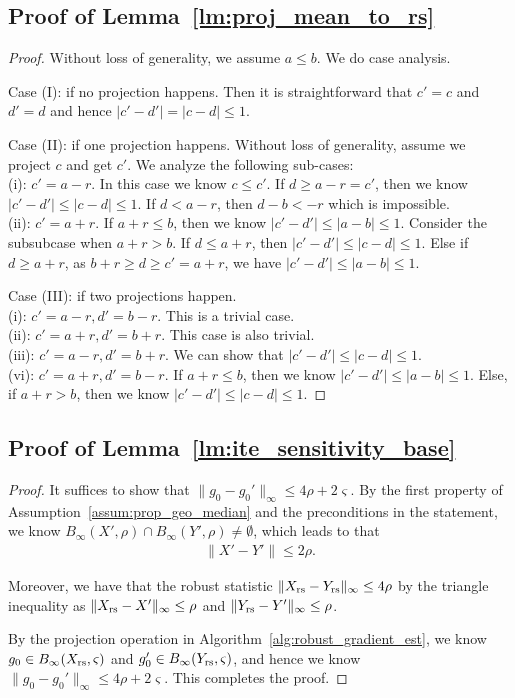 \subsection{Proof of Lemma~\ref{lm:proj_mean_to_rs}}
\projmeantors*
\begin{proof}
    Without loss of generality, we assume $a\le b$.
    We do case analysis.

    Case (I): if no projection happens. Then it is straightforward that $c'=c$ and $d'=d$ and hence $|c'-d'|=|c-d|\le 1$.

    Case (II): if one projection happens. Without loss of generality, assume we project $c$ and get $c'$. We analyze the following sub-cases:\\ 
    (i): $c'=a-r$. In this case we know $c\le c'$.
    If $d\ge a-r=c'$, then we know $|c'-d'|\le |c-d|\le 1$.
    If $d<a-r$, then $d-b<-r$ which is impossible.\\    
    (ii): $c'=a+r$. If $a+r\le b$, then we know $|c'-d'|\le |a-b|\le 1$.
    Consider the subsubcase when $a+r>b$. If $d\le a+r$, then $|c'-d'|\le |c-d|\le 1$.
    Else if $d\ge a+r$, as $b+r\ge d\ge c'=a+r$, we have $|c'-d'|\le |a-b|\le 1$.
    
    Case (III): if two projections happen.\\
    (i): $c'=a-r,d'=b-r$. This is a trivial case.\\
    (ii): $c'=a+r,d'=b+r$. This case is also trivial.\\
    (iii): $c'=a-r,d'=b+r$. We can show that $|c'-d'|\le |c-d|\le 1$.\\
    (vi): $c'=a+r,d'=b-r$. If $a+r\le b$, then we know $|c'-d'|\le |a-b|\le 1$.
    Else, if $a+r>b$, then we know $|c'-d'|\le |c-d|\le 1$.
\end{proof}

\subsection{Proof of Lemma~\ref{lm:ite_sensitivity_base}}
\itesensitivitybase*
\begin{proof}
It suffices to show that $\|g_0-g_0'\|_\infty\le 4\rho+2\varsigma$.
By the first property of Assumption~\ref{assum:prop_geo_median} and the preconditions in the statement, we know $B_\infty(X',\rho)\cap B_\infty(Y',\rho)\neq \emptyset$,
which leads to that
\begin{align*}
    \|X'-Y'\|\le 2\rho.
\end{align*}

Moreover, we have that the robust statistic $\|X_{\mathrm{rs}}-Y_{\mathrm{rs}}\|_\infty\le 4\rho$ by the triangle inequality as $\|X_{\mathrm{rs}}-X'\|_\infty\le \rho$ and $\|Y_{\mathrm{rs}}-Y'\|_\infty\le \rho$.

By the projection operation in Algorithm~\ref{alg:robust_gradient_est}, we know $g_0\in B_\infty(X_{\mathrm{rs}},\varsigma)$ and $g_0'\in B_\infty(Y_{\mathrm{rs}},\varsigma)$, and hence we know $\|g_0-g_0'\|_\infty\le 4\rho+2\varsigma$.
This completes the proof.
\end{proof}


